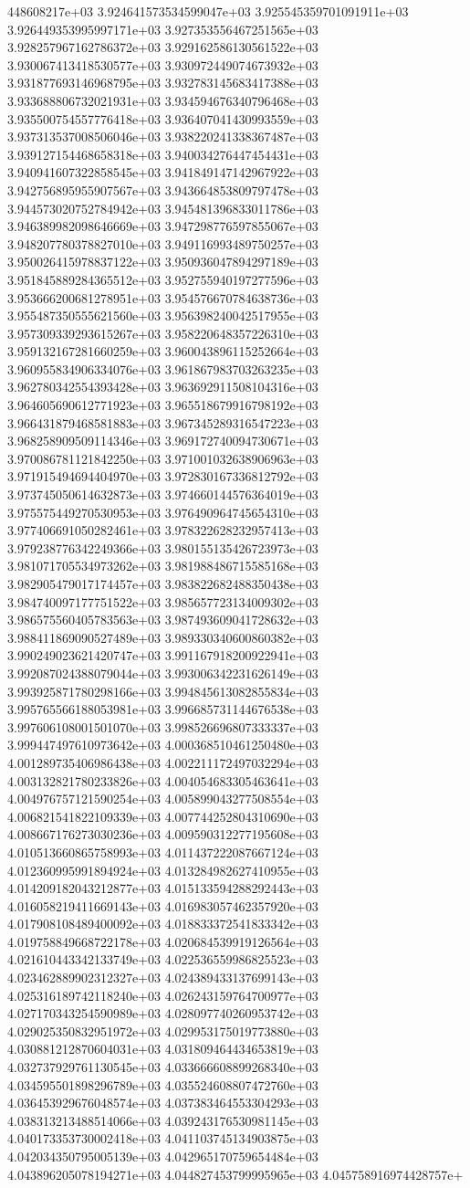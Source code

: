 448608217e+03	3.924641573534599047e+03	3.925545359701091911e+03	3.926449353995997171e+03	3.927353556467251565e+03	3.928257967162786372e+03	3.929162586130561522e+03	3.930067413418530577e+03	3.930972449074673932e+03	3.931877693146968795e+03	3.932783145683417388e+03	3.933688806732021931e+03	3.934594676340796468e+03	3.935500754557776418e+03	3.936407041430993559e+03	3.937313537008506046e+03	3.938220241338367487e+03	3.939127154468658318e+03	3.940034276447454431e+03	3.940941607322858545e+03	3.941849147142967922e+03	3.942756895955907567e+03	3.943664853809797478e+03	3.944573020752784942e+03	3.945481396833011786e+03	3.946389982098646669e+03	3.947298776597855067e+03	3.948207780378827010e+03	3.949116993489750257e+03	3.950026415978837122e+03	3.950936047894297189e+03	3.951845889284365512e+03	3.952755940197277596e+03	3.953666200681278951e+03	3.954576670784638736e+03	3.955487350555621560e+03	3.956398240042517955e+03	3.957309339293615267e+03	3.958220648357226310e+03	3.959132167281660259e+03	3.960043896115252664e+03	3.960955834906334076e+03	3.961867983703263235e+03	3.962780342554393428e+03	3.963692911508104316e+03	3.964605690612771923e+03	3.965518679916798192e+03	3.966431879468581883e+03	3.967345289316547223e+03	3.968258909509114346e+03	3.969172740094730671e+03	3.970086781121842250e+03	3.971001032638906963e+03	3.971915494694404970e+03	3.972830167336812792e+03	3.973745050614632873e+03	3.974660144576364019e+03	3.975575449270530953e+03	3.976490964745654310e+03	3.977406691050282461e+03	3.978322628232957413e+03	3.979238776342249366e+03	3.980155135426723973e+03	3.981071705534973262e+03	3.981988486715585168e+03	3.982905479017174457e+03	3.983822682488350438e+03	3.984740097177751522e+03	3.985657723134009302e+03	3.986575560405783563e+03	3.987493609041728632e+03	3.988411869090527489e+03	3.989330340600860382e+03	3.990249023621420747e+03	3.991167918200922941e+03	3.992087024388079044e+03	3.993006342231626149e+03	3.993925871780298166e+03	3.994845613082855834e+03	3.995765566188053981e+03	3.996685731144676538e+03	3.997606108001501070e+03	3.998526696807333337e+03	3.999447497610973642e+03	4.000368510461250480e+03	4.001289735406986438e+03	4.002211172497032294e+03	4.003132821780233826e+03	4.004054683305463641e+03	4.004976757121590254e+03	4.005899043277508554e+03	4.006821541822109339e+03	4.007744252804310690e+03	4.008667176273030236e+03	4.009590312277195608e+03	4.010513660865758993e+03	4.011437222087667124e+03	4.012360995991894924e+03	4.013284982627410955e+03	4.014209182043212877e+03	4.015133594288292443e+03	4.016058219411669143e+03	4.016983057462357920e+03	4.017908108489400092e+03	4.018833372541833342e+03	4.019758849668722178e+03	4.020684539919126564e+03	4.021610443342133749e+03	4.022536559986825523e+03	4.023462889902312327e+03	4.024389433137699143e+03	4.025316189742118240e+03	4.026243159764700977e+03	4.027170343254590989e+03	4.028097740260953742e+03	4.029025350832951972e+03	4.029953175019773880e+03	4.030881212870604031e+03	4.031809464434653819e+03	4.032737929761130545e+03	4.033666608899268340e+03	4.034595501898296789e+03	4.035524608807472760e+03	4.036453929676048574e+03	4.037383464553304293e+03	4.038313213488514066e+03	4.039243176530981145e+03	4.040173353730002418e+03	4.041103745134903875e+03	4.042034350795005139e+03	4.042965170759654484e+03	4.043896205078194271e+03	4.044827453799995965e+03	4.045758916974428757e+